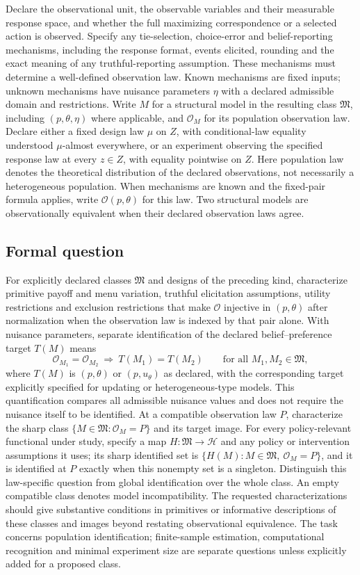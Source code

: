 \documentclass[11pt,a4paper]{article}
\begin{document}
Declare the observational unit, the observable variables and their measurable response space, and whether the full maximizing correspondence or a selected action is observed. Specify any tie-selection, choice-error and belief-reporting mechanisms, including the response format, events elicited, rounding and the exact meaning of any truthful-reporting assumption. These mechanisms must determine a well-defined observation law. Known mechanisms are fixed inputs; unknown mechanisms have nuisance parameters $\eta$ with a declared admissible domain and restrictions. Write $M$ for a structural model in the resulting class $\mathfrak M$, including $(p,\theta,\eta)$ where applicable, and $\mathcal O_M$ for its population observation law. Declare either a fixed design law $\mu$ on $Z$, with conditional-law equality understood $\mu$-almost everywhere, or an experiment observing the specified response law at every $z\in Z$, with equality pointwise on $Z$. Here population law denotes the theoretical distribution of the declared observations, not necessarily a heterogeneous population. When mechanisms are known and the fixed-pair formula applies, write $\mathcal O(p,\theta)$ for this law. Two structural models are observationally equivalent when their declared observation laws agree.
\subsection*{Formal question}
For explicitly declared classes $\mathfrak M$ and designs of the preceding kind, characterize primitive payoff and menu variation, truthful elicitation assumptions, utility restrictions and exclusion restrictions that make $\mathcal O$ injective in $(p,\theta)$ after normalization when the observation law is indexed by that pair alone. With nuisance parameters, separate identification of the declared belief--preference target $T(M)$ means
\[
 \mathcal O_{M_1}=\mathcal O_{M_2}\ \Longrightarrow\ T(M_1)=T(M_2)
 \qquad\text{for all }M_1,M_2\in\mathfrak M,
\]
where $T(M)$ is $(p,\theta)$ or $(p,u_\theta)$ as declared, with the corresponding target explicitly specified for updating or heterogeneous-type models. This quantification compares all admissible nuisance values and does not require the nuisance itself to be identified. At a compatible observation law $P$, characterize the sharp class $\{M\in\mathfrak M:\mathcal O_M=P\}$ and its target image. For every policy-relevant functional under study, specify a map $H:\mathfrak M\to\mathcal H$ and any policy or intervention assumptions it uses; its sharp identified set is $\{H(M):M\in\mathfrak M,\ \mathcal O_M=P\}$, and it is identified at $P$ exactly when this nonempty set is a singleton. Distinguish this law-specific question from global identification over the whole class. An empty compatible class denotes model incompatibility. The requested characterizations should give substantive conditions in primitives or informative descriptions of these classes and images beyond restating observational equivalence. The task concerns population identification; finite-sample estimation, computational recognition and minimal experiment size are separate questions unless explicitly added for a proposed class.
\end{document}
